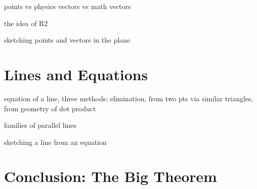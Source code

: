 \documentclass[00-livre-main.tex]{subfiles}
\begin{document}
\begin{compactitem}
\item points vs physics vectors vs math vectors
\item the idea of R2
\item sketching points and vectors in the plane
\end{compactitem}


\section*{Lines and Equations}
\begin{compactitem}
\item equation of a line, three methods: elimination, from two pts via similar triangles, from geometry of dot product
\item families of parallel lines
\item sketching a line from an equation
\end{compactitem}

\section*{Conclusion: The Big Theorem}
\end{document}
